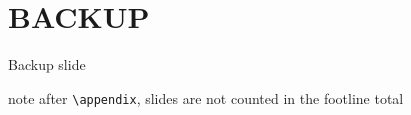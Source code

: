 \documentclass[aspectratio=169,10pt]{beamer}
\begin{document}

\appendix
\section*{BACKUP}

\begin{frame}{Backup slide}
\begin{tbox}{note}
\small
after \texttt{\textbackslash appendix}, slides are not counted in the footline total
\end{tbox}
\end{frame}
\end{document}
